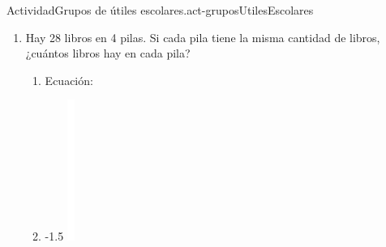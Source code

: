 \documentclass[14pt]{extarticle}
\begin{document}
\begin{activity}{Actividad}{Grupos de útiles escolares.}{act-gruposUtilesEscolares}
\begin{enumerate}
\begin{enumerate}
\begin{image}{0}{1}{0}{-1.5\baselineskip}
\end{image}%
%
\end{enumerate}
\item{}Hay 28 libros en 4 pilas. Si cada pila tiene la misma cantidad de libros, ¿cuántos libros hay en cada pila?%
%
\begin{enumerate}
\item{}Ecuación:%
\item{}\begin{image}{0}{1}{0}{-1.5\baselineskip}%
\includegraphics[max width=\linewidth, center]{external/whitespace-tikz/3cm.pdf}

\end{image}
\end{enumerate}
\end{enumerate}
\end{activity}
\end{document}
